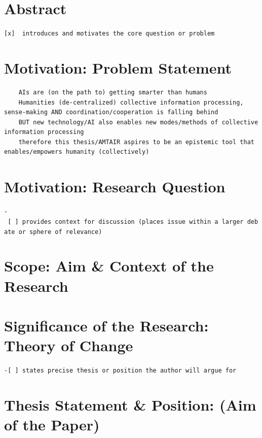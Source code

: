 \documentclass[
  letterpaper,
]{book}
\begin{document}
\section{Abstract}\label{abstract}

\texttt{{[}x{]}\ \ introduces\ and\ motivates\ the\ core\ question\ or\ problem}

\section{Motivation: Problem
Statement}\label{motivation-problem-statement}

\begin{verbatim}
    AIs are (on the path to) getting smarter than humans
    Humanities (de-centralized) collective information processing, sense-making AND coordination/cooperation is falling behind
    BUT new technology/AI also enables new modes/methods of collective information processing
    therefore this thesis/AMTAIR aspires to be an epistemic tool that enables/empowers humanity (collectively)
\end{verbatim}

\section{Motivation: Research
Question}\label{motivation-research-question}

\texttt{-\ {[}\ {]}\ provides\ context\ for\ discussion\ (places\ issue\ within\ a\ larger\ debate\ or\ sphere\ of\ relevance)}

\section{Scope: Aim \& Context of the
Research}\label{scope-aim-context-of-the-research}

\section{Significance of the Research: Theory of
Change}\label{significance-of-the-research-theory-of-change}

\texttt{-{[}\ {]}\ states\ precise\ thesis\ or\ position\ the\ author\ will\ argue\ for}

\section{Thesis Statement \& Position: (Aim of the
Paper)}\label{thesis-statement-position-aim-of-the-paper}
\end{document}

